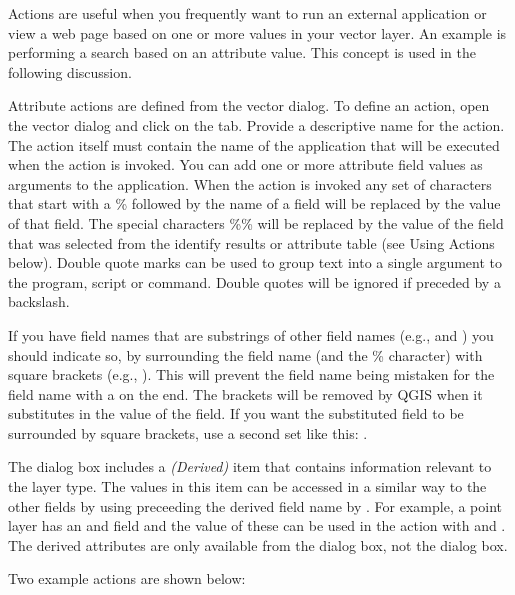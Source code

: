 Actions are useful when you frequently want to run an external application or
view a web page based on one or more values in your vector layer. An example
is performing a search based on an attribute value. This concept is used in 
the following discussion.


Attribute actions are defined from the vector  dialog. To
define an action, open the vector  dialog and click on the
 tab. Provide a descriptive name for the action. The action
itself must contain the name of the application that will be executed when the
action is invoked. You can add one or more attribute field values as arguments
to the application. When the action is invoked any set of characters that
start with a \% followed by the name of a field will be replaced by the value of
that field. The special characters \%\% \index{\%\%}will be replaced by the value
of the field that was selected from the identify results or attribute table (see
Using Actions below).  Double quote marks can be used to group text into a
single argument to the program, script or command. Double quotes will be
ignored if preceded by a backslash.

If you have field names that are substrings of other field names (e.g., 
and ) you should
indicate so, by surrounding the field name (and the \% character) with square
brackets (e.g., \usertext{[\%col10]}). This will prevent the  field
name being mistaken for the  field name with a 
on the end. The brackets will be removed by QGIS when it substitutes in the
value of the field. If you want the substituted field to be surrounded by square
brackets, use a second set like this: \usertext{[[\%col10]]}.

The  dialog box includes a {\em (Derived)} item that
contains information relevant to the layer type. The
values in this item can be accessed in a similar way to the other fields
by using preceeding the derived field name by . For
example, a point layer has an  and  field and the
value of these can be used in the action with  and
. The derived attributes are only available from the
 dialog box, not the  dialog box.

Two example actions are shown below:

